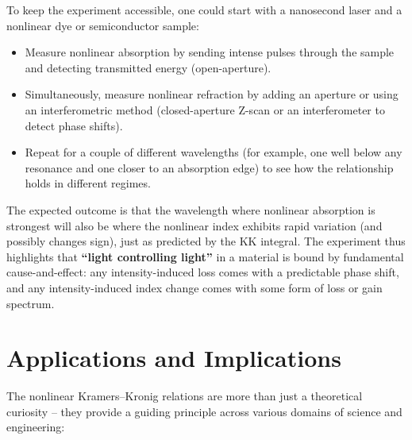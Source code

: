 \documentclass[11pt,a4paper]{article}
\begin{document}
To keep the experiment accessible, one could start with a nanosecond laser and a nonlinear dye or semiconductor sample:

\begin{itemize}
  \item Measure nonlinear absorption by sending intense pulses through the sample and detecting transmitted energy (open-aperture).
  \item Simultaneously, measure nonlinear refraction by adding an aperture or using an interferometric method (closed-aperture Z-scan or an interferometer to detect phase shifts).
  \item Repeat for a couple of different wavelengths (for example, one well below any resonance and one closer to an absorption edge) to see how the relationship holds in different regimes.
\end{itemize}

The expected outcome is that the wavelength where nonlinear absorption is strongest will also be where the nonlinear index exhibits rapid variation (and possibly changes sign), just as predicted by the KK integral. The experiment thus highlights that \textbf{“light controlling light”} in a material is bound by fundamental cause-and-effect: any intensity-induced loss comes with a predictable phase shift, and any intensity-induced index change comes with some form of loss or gain spectrum.

\section{Applications and Implications}

The nonlinear Kramers–Kronig relations are more than just a theoretical curiosity – they provide a guiding principle across various domains of science and engineering:
\end{document}
